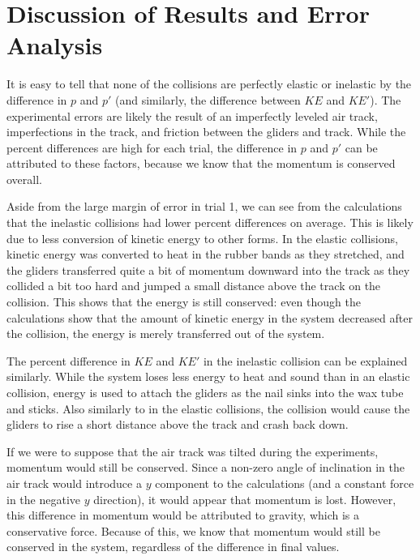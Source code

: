 \section*{Discussion of Results and Error Analysis}

It is easy to tell that none of the collisions are perfectly elastic or inelastic by the difference in $p$ and $p'$ (and similarly, the difference between $KE$ and $KE'$). The experimental errors are likely the result of an imperfectly leveled air track, imperfections in the track, and friction between the gliders and track. While the percent differences are high for each trial, the difference in $p$ and $p'$ can be attributed to these factors, because we know that the momentum is conserved overall.

\bigskip

Aside from the large margin of error in trial 1, we can see from the calculations that the inelastic collisions had lower percent differences on average. This is likely due to less conversion of kinetic energy to other forms. In the elastic collisions, kinetic energy was converted to heat in the rubber bands as they stretched, and the gliders transferred quite a bit of momentum downward into the track as they collided a bit too hard and jumped a small distance above the track on the collision. This shows that the energy is still conserved: even though the calculations show that the amount of kinetic energy in the system decreased after the collision, the energy is merely transferred out of the system.

\bigskip

The percent difference in $KE$ and $KE'$ in the inelastic collision can be explained similarly. While the system loses less energy to heat and sound than in an elastic collision, energy is used to attach the gliders as the nail sinks into the wax tube and sticks. Also similarly to in the elastic collisions, the collision would cause the gliders to rise a short distance above the track and crash back down.

\bigskip

If we were to suppose that the air track was tilted during the experiments, momentum would still be conserved. Since a non-zero angle of inclination in the air track would introduce a $y$ component to the calculations (and a constant force in the negative $y$ direction), it would appear that momentum is lost. However, this difference in momentum would be attributed to gravity, which is a conservative force. Because of this, we know that momentum would still be conserved in the system, regardless of the difference in final values.
